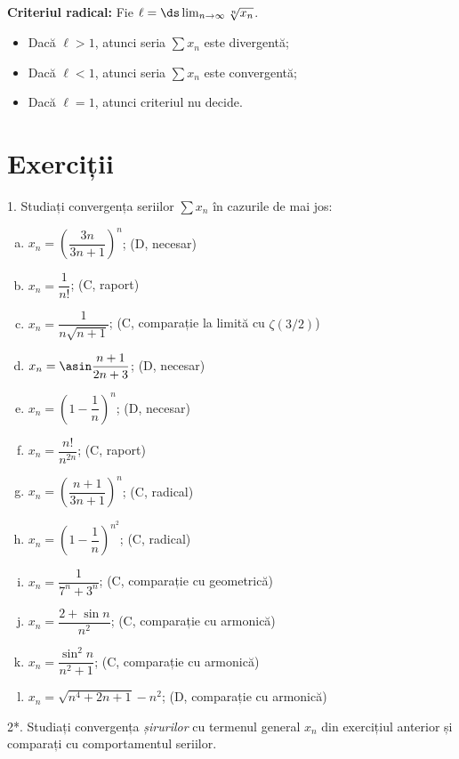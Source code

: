 \textbf{Criteriul radical:} Fie $ \ell = \ds\lim_{n \to \infty} \sqrt[n]{x_n} $.
\begin{itemize}
    \item Dacă $ \ell > 1 $, atunci seria $ \sum x_n $ este divergentă;
    \item Dacă $ \ell < 1 $, atunci seria $ \sum x_n $ este convergentă;
    \item Dacă $ \ell = 1 $, atunci criteriul nu decide.
\end{itemize}

\newpage
\section{Exerciții}

1. Studiați convergența seriilor $ \sum x_n $ în cazurile de mai jos:
\begin{enumerate}[(a)]
    \item $ x_n = \left( \dfrac{3n}{3n + 1} \right)^n $; \hfill(D, necesar)
    \item $ x_n = \dfrac{1}{n!} $; \hfill(C, raport)
    \item $ x_n = \dfrac{1}{n\sqrt{n + 1}} $; \hfill(C, comparație la limită cu $\zeta(3/2)$)
    \item $ x_n = \asin \dfrac{n+1}{2n + 3} $; \hfill(D, necesar)
    \item $ x_n = \left( 1 - \dfrac{1}{n} \right)^n $; \hfill(D, necesar)
    \item $ x_n = \dfrac{n!}{n^{2n}} $; \hfill(C, raport)
    \item $ x_n = \left( \dfrac{n + 1}{3n + 1}\right)^n $; \hfill(C, radical)
    \item $ x_n = \left( 1 - \dfrac{1}{n} \right)^{n^2} $; \hfill(C, radical)
    \item $ x_n = \dfrac{1}{7^n + 3^n} $; \hfill(C, comparație cu geometrică)
    \item $ x_n = \dfrac{2 + \sin n}{n^2} $; \hfill(C, comparație cu armonică)
    \item $ x_n = \dfrac{\sin^2 n}{n^2 + 1} $; \hfill(C, comparație cu armonică)
    \item $ x_n = \sqrt{n^4 + 2n + 1} - n^2 $; \hfill(D, comparație cu armonică)
\end{enumerate}

2*. Studiați convergența \emph{șirurilor} cu termenul general $ x_n $ din
exercițiul anterior și comparați cu comportamentul seriilor.
